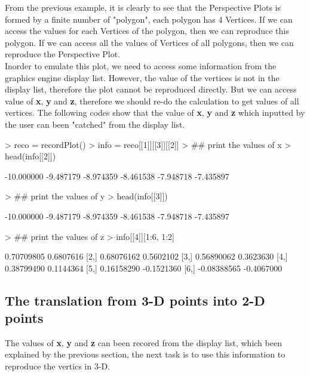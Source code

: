 \documentclass[paper=a4, fontsize=11pt]{report}
\begin{document}
From the previous example, it is clearly to see that the Perspective Plots is formed by a finite number of "polygon", each polygon has 4 Vertices. If we can access the values for each Vertices of the polygon, then we can reproduce this polygon. If we can access all the values of Vertices of all polygons, then we can reproduce the Perspective Plot. \\

Inorder to emulate this plot, we need to access some information from the graphics engine display list. However, the value of the vertices is not in the display list, therefore the plot cannot be reproduced directly. But we can access value of \textbf{x}, \textbf{y} and \textbf{z}, therefore we should re-do the calculation to get values of all vertices. The following codes show that the value of \textbf{x}, \textbf{y} and \textbf{z} which inputted by the user can been "catched" from the display list.
\begin{Schunk}
\begin{Sinput}
> reco = recordPlot()
> info = reco[[1]][[3]][[2]]
> ## print the values of x
> head(info[[2]])
\end{Sinput}
\begin{Soutput}
[1] -10.000000  -9.487179  -8.974359  -8.461538  -7.948718  -7.435897
\end{Soutput}
\begin{Sinput}
> ## print the values of y
> head(info[[3]])
\end{Sinput}
\begin{Soutput}
[1] -10.000000  -9.487179  -8.974359  -8.461538  -7.948718  -7.435897
\end{Soutput}
\begin{Sinput}
> ## print the values of z
> info[[4]][1:6, 1:2]
\end{Sinput}
\begin{Soutput}
            [,1]       [,2]
[1,]  0.70709805  0.6807616
[2,]  0.68076162  0.5602102
[3,]  0.56890062  0.3623630
[4,]  0.38799490  0.1144364
[5,]  0.16158290 -0.1521360
[6,] -0.08388565 -0.4067000
\end{Soutput}
\end{Schunk}
\subsection{The translation from 3-D points into 2-D points}
The values of \textbf{x}, \textbf{y} and \textbf{z} can been recored from the display list, which been explained by the previous section, the next task is to use this information to reproduce the vertics in 3-D.\\
\end{document}
